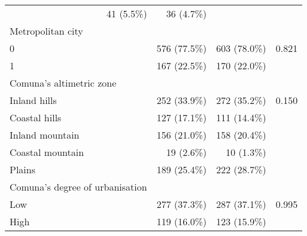 \begin{table}[!h]
\begin{tabular}{llll}
  \multicolumn{1}{r}{41 (5.5\%)} &
  \multicolumn{1}{r}{36 (4.7\%)} &
  \multicolumn{1}{r}{} \\
\multicolumn{1}{l}{Metropolitan city} &
  \multicolumn{1}{r}{} &
  \multicolumn{1}{r}{} &
  \multicolumn{1}{r}{} \\
\multicolumn{1}{l}{\hspace{1em}0} &
  \multicolumn{1}{r}{576 (77.5\%)} &
  \multicolumn{1}{r}{603 (78.0\%)} &
  \multicolumn{1}{r}{0.821} \\
\multicolumn{1}{l}{\hspace{1em}1} &
  \multicolumn{1}{r}{167 (22.5\%)} &
  \multicolumn{1}{r}{170 (22.0\%)} &
  \multicolumn{1}{r}{} \\
\multicolumn{1}{l}{Comuna's altimetric zone} &
  \multicolumn{1}{r}{} &
  \multicolumn{1}{r}{} &
  \multicolumn{1}{r}{} \\
\multicolumn{1}{l}{\hspace{1em}Inland hills} &
  \multicolumn{1}{r}{252 (33.9\%)} &
  \multicolumn{1}{r}{272 (35.2\%)} &
  \multicolumn{1}{r}{0.150} \\
\multicolumn{1}{l}{\hspace{1em}Coastal hills} &
  \multicolumn{1}{r}{127 (17.1\%)} &
  \multicolumn{1}{r}{111 (14.4\%)} &
  \multicolumn{1}{r}{} \\
\multicolumn{1}{l}{\hspace{1em}Inland mountain} &
  \multicolumn{1}{r}{156 (21.0\%)} &
  \multicolumn{1}{r}{158 (20.4\%)} &
  \multicolumn{1}{r}{} \\
\multicolumn{1}{l}{\hspace{1em}Coastal mountain} &
  \multicolumn{1}{r}{19 (2.6\%)} &
  \multicolumn{1}{r}{10 (1.3\%)} &
  \multicolumn{1}{r}{} \\
\multicolumn{1}{l}{\hspace{1em}Plains} &
  \multicolumn{1}{r}{189 (25.4\%)} &
  \multicolumn{1}{r}{222 (28.7\%)} &
  \multicolumn{1}{r}{} \\
\multicolumn{1}{l}{Comuna's degree of urbanisation} &
  \multicolumn{1}{r}{} &
  \multicolumn{1}{r}{} &
  \multicolumn{1}{r}{} \\
\multicolumn{1}{l}{\hspace{1em}Low} &
  \multicolumn{1}{r}{277 (37.3\%)} &
  \multicolumn{1}{r}{287 (37.1\%)} &
  \multicolumn{1}{r}{0.995} \\
\multicolumn{1}{l}{\hspace{1em}High} &
  \multicolumn{1}{r}{119 (16.0\%)} &
  \multicolumn{1}{r}{123 (15.9\%)} &
  \multicolumn{1}{r}{} \\

\end{tabular}
\end{table}
